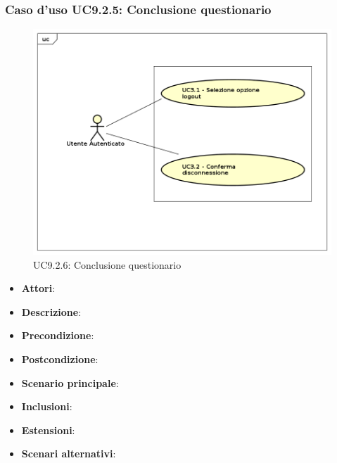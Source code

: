 		\subsubsection{Caso d'uso UC9.2.5: Conclusione questionario}
		\label{UC9.2.6}
		\begin{figure}[h]
			\centering
			\includegraphics[scale=0.7,keepaspectratio]{UML/UC9.png}
			\caption{UC9.2.6: Conclusione questionario}
		\end{figure}
		\FloatBarrier
		\begin{itemize}
			\item \textbf{Attori}: 
			\item \textbf{Descrizione}: 
			\item \textbf{Precondizione}: 
			\item \textbf{Postcondizione}: 
			\item \textbf{Scenario principale}:
			\item \textbf{Inclusioni}:
			\item \textbf{Estensioni}:
			\item \textbf{Scenari alternativi}:
		\end{itemize}
				
